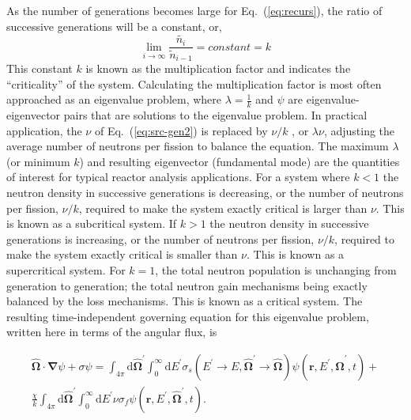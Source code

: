 \noindent
	As the number of generations becomes large for Eq.~(\ref{eq:recurs}), the ratio of
	successive generations will be a constant, or, 
\begin{equation}
	\lim_{i\rightarrow \infty}\frac{\tilde{n_i}}{\tilde{n}_{i-1}}=constant={k}
\end{equation}
\noindent
	\indent This constant ${k}$ is known as the multiplication factor and indicates the
	``criticality'' of the system.  Calculating the multiplication factor is most
	often approached as an eigenvalue problem, where ${\lambda=\frac{1}{k}}$ and ${\psi}$
	are eigenvalue-eigenvector pairs that are solutions to the eigenvalue problem.  In practical
	application, the ${\nu}$ of Eq.~(\ref{eq:src-gen2}) is replaced by ${\nu/{k}}$ , or
	${\lambda{\nu}}$, adjusting the average number of neutrons per fission to balance the
	equation.  The maximum ${\lambda}$ (or minimum ${k}$) and resulting 
	eigenvector (fundamental mode) are the quantities of interest for typical reactor analysis 
	applications.  For a system where
	${k} < {1}$ the neutron density in successive generations is decreasing, or the number
	of neutrons per fission, ${\nu/{k}}$, required to make the system exactly critical is larger
	than ${\nu}$.  This is known as a subcritical system.  If ${k} > 1$ the neutron density in
	successive generations is increasing,  or the number of neutrons per fission, ${\nu/{k}}$,
	required to make the system exactly critical is smaller than ${\nu}$.  This is known as a
	supercritical system.  For ${k} = 1$, the total neutron population is unchanging from
	generation to generation; the total neutron gain mechanisms being exactly balanced by the
	loss mechanisms.  This is known as a critical system.  The resulting time-independent governing
	equation for this eigenvalue problem, written here in terms of the angular flux, is
	
\begin{multline}
	\mathbf{\hat{\Omega}} \!\cdot\! \mathbf{\nabla}{\psi}
		 + \sigma{\psi} = \int_{4\pi}\mathrm {d}\mathbf{\hat{\Omega}}^{'}\int_{0}^{\infty}
		\mathrm{d}{E}^{'}\sigma_{s}({E}^{'}\rightarrow{E},\mathbf{\hat{\Omega}}^{'}\rightarrow
		\mathbf{\hat{\Omega}})\psi(\mathbf{r},{E}^{'},\mathbf{\hat{\Omega}}^{'},t)+ \\ 
		\frac{\chi}{k} \int_{4\pi}\mathrm{d}\mathbf
		{\hat{\Omega}}^{'}\int_{0}^{\infty}\mathrm{d}{E}^{'}\nu{\sigma_f}{\psi}
		(\mathbf{r},{E}^{'},\mathbf{\hat{\Omega}}^{'},t).
	\label{eq:crit}
\end{multline}

